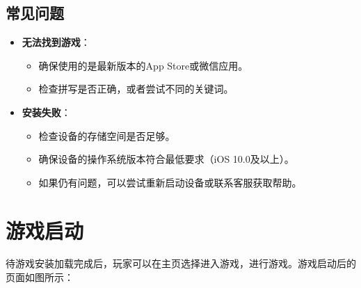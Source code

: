 \documentclass{mancls}%
\begin{document}
\subsection{常见问题}

\begin{itemize}
  \item \textbf{无法找到游戏}：
        \begin{itemize}
          \item 确保使用的是最新版本的App Store或微信应用。
          \item 检查拼写是否正确，或者尝试不同的关键词。
        \end{itemize}
  \item \textbf{安装失败}：
        \begin{itemize}
          \item 检查设备的存储空间是否足够。
          \item 确保设备的操作系统版本符合最低要求（iOS 10.0及以上）。
          \item 如果仍有问题，可以尝试重新启动设备或联系客服获取帮助。
        \end{itemize}
\end{itemize}
\pagebreak
\section{游戏启动}

待游戏安装加载完成后，玩家可以在主页选择进入游戏，进行游戏。游戏启动后的页面如图所示：
\end{document}
